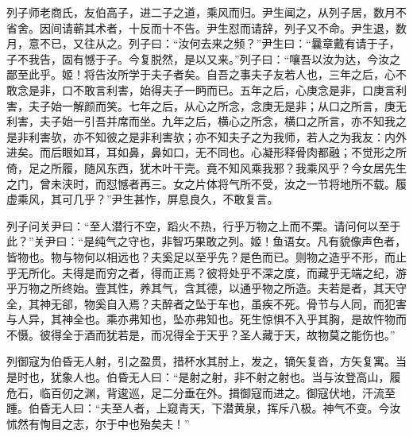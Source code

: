 \documentclass[]{article}
\begin{document}
列子师老商氏，友伯高子，进二子之道，乘风而归。尹生闻之，从列子居，数月不省舍。因间请蕲其术者，十反而十不告。尹生怼而请辞，列子又不命。尹生退，数月，意不已，又往从之。列子曰：``汝何去来之频？''尹生曰：``曩章戴有请于子，子不我告，固有憾于子。今复脱然，是以又来。''列子曰：``嚷吾以汝为达，今汝之鄙至此乎。姬！将告汝所学于夫子者矣。自吾之事夫子友若人也，三年之后，心不敢念是非，口不敢言利害，始得夫子一眄而已。五年之后，心庚念是非，口庚言利害，夫子始一解颜而笑。七年之后，从心之所念，念庚无是非；从口之所言，庚无利害，夫子始一引吾并席而坐。九年之后，横心之所念，横口之所言，亦不知我之是非利害欤，亦不知彼之是非利害欤；亦不知夫子之为我师，若人之为我友：内外进矣。而后眼如耳，耳如鼻，鼻如口，无不同也。心凝形释骨肉都融；不觉形之所倚，足之所履，随风东西，犹木叶干壳。竟不知风乘我邪？我乘风乎？今女居先生之门，曾未浃时，而怼憾者再三。女之片体将气所不受，汝之一节将地所不载。履虚乘风，其可几乎？''尹生甚怍，屏息良久，不敢复言。

列子问关尹曰：``至人潜行不空，蹈火不热，行乎万物之上而不栗。请问何以至于此？''关尹曰：``是纯气之守也，非智巧果敢之列。姬！鱼语女。凡有貌像声色者，皆物也。物与物何以相远也？夫奚足以至乎先？是色而已。则物之造乎不形，而止乎无所化。夫得是而穷之者，得而正焉？彼将处乎不深之度，而藏乎无端之纪，游乎万物之所终始。壹其性，养其气，含其德，以通乎物之所造。夫若是者，其天守全，其神无郤，物奚自入焉？夫醉者之坠于车也，虽疾不死。骨节与人同，而犯害与人异，其神全也。乘亦弗知也，坠亦弗知也。死生惊惧不入乎其胸，是故忤物而不慑。彼得全于酒而犹若是，而况得全于天乎？圣人藏于天，故物莫之能伤也。''

列御寇为伯昏无人射，引之盈贯，措杯水其肘上，发之，镝矢复沓，方矢复寓。当是时也，犹象人也。伯昏无人曰：``是射之射，非不射之射也。当与汝登高山，履危石，临百仞之渊，背逡巡，足二分垂在外。揖御寇而进之。御寇伏地，汗流至踵。伯昏无人曰：``夫至人者，上窥青天，下潜黄泉，挥斥八极。神气不变。今汝怵然有恂目之志，尔于中也殆矣夫！''
\end{document}
